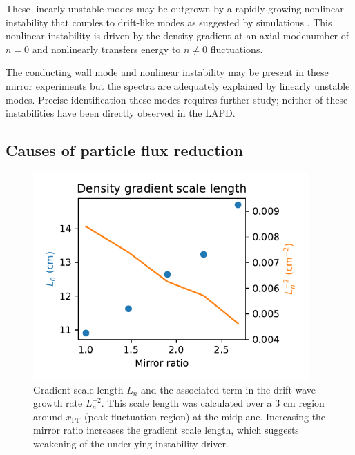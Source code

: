 These linearly unstable modes may be outgrown by a rapidly-growing nonlinear instability that couples to drift-like modes as suggested by simulations \cite{Friedman_2013}. This nonlinear instability is driven by the density gradient at an axial modenumber of $n=0$ and nonlinearly transfers energy to $n \neq 0$ fluctuations. 

The conducting wall mode and nonlinear instability may be present in these mirror experiments but the spectra are adequately explained by linearly unstable modes. Precise identification these modes requires further study; neither of these instabilities have been directly observed in the LAPD.

\subsection{Causes of particle flux reduction}

\begin{figure}
    \centering
    \includegraphics[width=300pt]{figures/fig19.pdf}
    \caption[Gradient scale length $L_n$]{Gradient scale length $L_n$ and the associated term in the drift wave growth rate $L_n^{-2}$. This scale length was calculated over a 3 cm region around $x_\text{PF}$ (peak fluctuation region) at the midplane. Increasing the mirror ratio increases the gradient scale length, which suggests weakening of the underlying instability driver.}
    \label{fig:L_n}
\end{figure}

